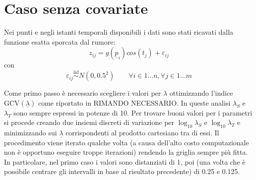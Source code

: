 \documentclass[a4paper,11pt,twoside,openright]{book}							%
\begin{document}


\section{Caso senza covariate}
Nei punti e negli istanti temporali disponibili i dati sono stati ricavati dalla funzione esatta sporcata dal rumore:
$$
z_{ij}=g(\underline p_{i})cos(t_j) + \varepsilon_{ij}
$$
con
$$
\varepsilon_{ij}\stackrel{\mathrm{iid}}{\sim}N(0,0.5^2) \qquad \forall i \in 1\ldots n, \forall j \in 1\ldots m
$$

Come primo passo è necessario scegliere i valori per $\lambda$ ottimizzando l'indice $\mathrm{GCV}(\underline \lambda)$ come riportato in RIMANDO NECESSARIO. In queste analisi $\lambda_S$ e $\lambda_T$ sono sempre espressi in potenze di 10. Per trovare buoni valori per i parametri si procede creando due insiemi discreti di variazione per $\log_{10}\lambda_S$ e $\log_{10}\lambda_T$ e minimizzando sui $\underline \lambda$ corrispondenti al prodotto cartesiano tra di essi. Il procedimento viene iterato qualche volta (a causa dell'alto costo computazionale non è opportuno eseguire troppe iterazioni) rendendo la griglia sempre più fitta. In particolare, nel primo caso i valori sono distanziati di 1, poi (una volta che è possibile centrare gli intervalli in base al risultato precedente) di 0.25 e 0.125.
\end{document}
